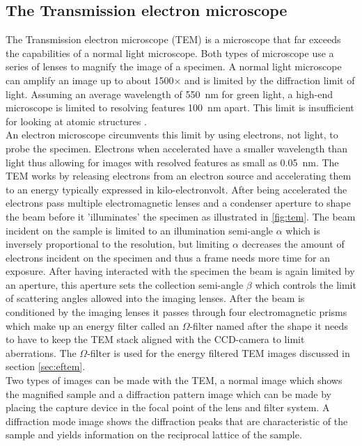 \subsection{The Transmission electron microscope}
The Transmission electron microscope (TEM) is a microscope that far exceeds the capabilities of a normal light microscope. Both types of microscope use a series of lenses to magnify the image of a specimen.
A normal light microscope can amplify an image up to about 1500$\times$ and is limited by the diffraction limit of light. Assuming an average wavelength of \SI{550}{\nm} for green light, a high-end microscope is limited to resolving features \SI{100}{\nm} apart.
This limit is insufficient for looking at atomic structures \cite{PhysRevLett.106.193905}.\\
An electron microscope circumvents this limit by using electrons, not light, to probe the specimen. Electrons when accelerated have a smaller wavelength than light thus allowing for images with resolved features as small as \SI{0.05}{\nm}. \cite{kisielowski_freitag_bischoff_van}
The TEM works by releasing electrons from an electron source and accelerating them to an energy typically expressed in kilo-electronvolt.
After being accelerated the electrons pass multiple electromagnetic lenses and a condenser aperture to shape the beam before it 'illuminates' the specimen as illustrated in \ref{fig:tem}.
The beam incident on the sample is limited to an illumination semi-angle $\alpha$ which is inversely proportional to the resolution, but limiting $\alpha$ decreases the amount of electrons incident on the specimen and thus a frame needs more time for an exposure.
After having interacted with the specimen the beam is again limited by an aperture, this aperture sets the collection semi-angle $\beta$ which controls the limit of scattering angles allowed into the imaging lenses.
After the beam is conditioned by the imaging lenses it passes through four electromagnetic prisms which make up an energy filter called an $\Omega$-filter named after the shape it needs to have to keep the TEM stack aligned with the CCD-camera to limit aberrations.
The $\Omega$-filter is used for the energy filtered TEM images discussed in section \ref{sec:eftem}.\\
Two types of images can be made with the TEM, a normal image which shows the magnified sample and a diffraction pattern image which can be made by placing the capture device in the focal point of the lens and filter system.
A diffraction mode image shows the diffraction peaks that are characteristic of the sample and yields information on the reciprocal lattice of the sample. \cite{Egerton_2008}

